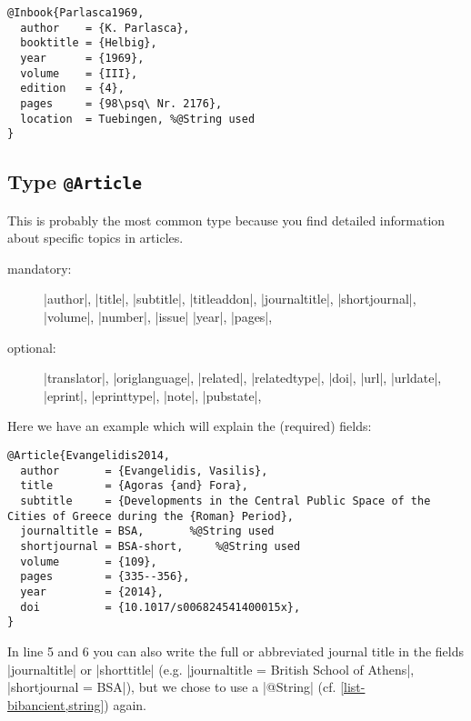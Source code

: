 \documentclass[a4paper,
10pt,
greek,
french,
spanish,
italian,
ngerman,
english
]{ltxdoc}
\begin{document}
\begin{lstlisting}[style=bibentry,label=Parlasca1969,caption={{@}Inbook\{Parlasca1969,…\} }]
@Inbook{Parlasca1969,
  author    = {K. Parlasca},
  booktitle = {Helbig},
  year      = {1969},
  volume    = {III},
  edition   = {4},
  pages     = {98\psq\ Nr. 2176},
  location  = Tuebingen, %@String used
}
\end{lstlisting}


\begin{refsection}\end{refsection}

\subsection{Type \texttt{@Article}}\label{article}
 This is probably the most common type because you find detailed information about specific topics in articles.


\begin{description}
\item[mandatory:] 
|author|, |title|, |subtitle|, |titleaddon|,
|journaltitle|, |shortjournal|, |volume|, |number|, |issue|
|year|, |pages|, 
\item[optional:]
|translator|, |origlanguage|,
|related|, |relatedtype|,
|doi|, |url|, |urldate|, |eprint|, |eprinttype|, |note|, |pubstate|, 
 \end{description}

Here we have an example which will explain the (required)  fields:
\begin{lstlisting}[style=bibentry,label=Evangelidis2014,caption={{@}Article\{Evangelidis2014,…\} }]
@Article{Evangelidis2014,
  author       = {Evangelidis, Vasilis},
  title        = {Agoras {and} Fora},
  subtitle     = {Developments in the Central Public Space of the Cities of Greece during the {Roman} Period},
  journaltitle = BSA,		%@String used
  shortjournal = BSA-short,		%@String used
  volume       = {109},
  pages        = {335--356},
  year         = {2014},
  doi          = {10.1017/s006824541400015x},
}
\end{lstlisting}
In line 5 and 6 you can also write the full or abbreviated journal title in the fields |journaltitle| or |shorttitle| (e.g. |journaltitle = {British School of Athens}|, |shortjournal = {BSA}|), but we chose to use a |@String| (cf. \cref{list-bibancient,string}) again.
\end{document}
